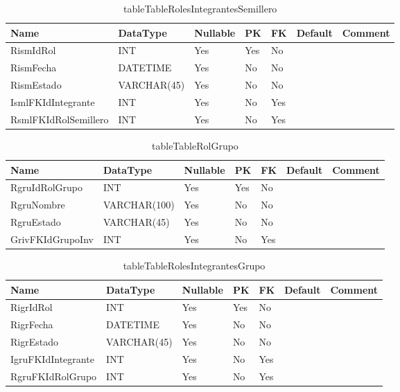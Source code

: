 \begin{table}
	\caption{tableTableRolesIntegrantesSemillero}
	\label{labelTableRolesIntegrantesSemillero}
	\begin{tabular}{ |l|l|l|l|l|l|l| }
		\hline
		Name & DataType & Nullable & PK & FK & Default & Comment \\ \hline
		RismIdRol & INT & Yes & Yes & No &  & \\ \hline 
		RismFecha & DATETIME & Yes & No & No &  & \\ \hline 
		RismEstado & VARCHAR(45) & Yes & No & No &  & \\ \hline 
		IsmlFKIdIntegrante & INT & Yes & No & Yes &  & \\ \hline 
		RsmlFKIdRolSemillero & INT & Yes & No & Yes &  & \\ \hline 
		
	\end{tabular}
\end{table}


\begin{table}
	\caption{tableTableRolGrupo}
	\label{labelTableRolGrupo}
	\begin{tabular}{ |l|l|l|l|l|l|l| }
		\hline
		Name & DataType & Nullable & PK & FK & Default & Comment \\ \hline
		RgruIdRolGrupo & INT & Yes & Yes & No &  & \\ \hline 
		RgruNombre & VARCHAR(100) & Yes & No & No &  & \\ \hline 
		RgruEstado & VARCHAR(45) & Yes & No & No &  & \\ \hline 
		GrivFKIdGrupoInv & INT & Yes & No & Yes &  & \\ \hline 
		
	\end{tabular}
\end{table}


\begin{table}
	\caption{tableTableRolesIntegrantesGrupo}
	\label{labelTableRolesIntegrantesGrupo}
	\begin{tabular}{ |l|l|l|l|l|l|l| }
		\hline
		Name & DataType & Nullable & PK & FK & Default & Comment \\ \hline
		RigrIdRol & INT & Yes & Yes & No &  & \\ \hline 
		RigrFecha & DATETIME & Yes & No & No &  & \\ \hline 
		RigrEstado & VARCHAR(45) & Yes & No & No &  & \\ \hline 
		IgruFKIdIntegrante & INT & Yes & No & Yes &  & \\ \hline 
		RgruFKIdRolGrupo & INT & Yes & No & Yes &  & \\ \hline 
		
	\end{tabular}
\end{table}


